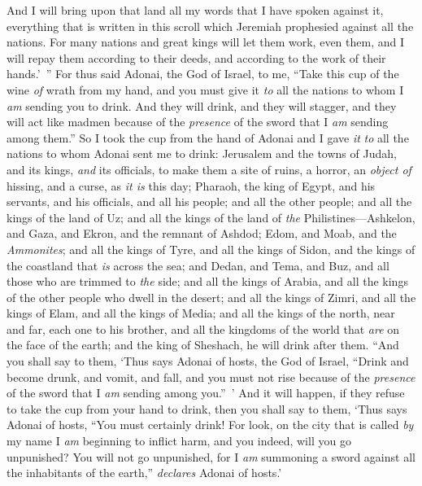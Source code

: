\begin{biblechapter}
\verse And I will bring upon that land all my words that I have spoken against it, everything that is written in this scroll which Jeremiah prophesied against all the nations.
\verse For many nations and great kings will let them work, even them, and I will repay them according to their deeds, and according to the work of their hands.’ ”
\verse For thus said Adonai, the God of Israel, to me, “Take this cup of the wine \textit{of} wrath from my hand, and you must give it \textit{to} all the nations to whom I \textit{am} sending you to drink.
\verse And they will drink, and they will stagger, and they will act like madmen because of the \textit{presence} of the sword that I \textit{am} sending among them.”
\verse So I took the cup from the hand of Adonai and I gave \textit{it} \textit{to} all the nations to whom Adonai sent me to drink:
\verse Jerusalem and the towns of Judah, and its kings, \textit{and} its officials, to make them a site of ruins, a horror, an \textit{object of} hissing, and a curse, as \textit{it is} this day;
\verse Pharaoh, the king of Egypt, and his servants, and his officials, and all his people;
\verse and all the other people; and all the kings of the land of Uz; and all the kings of the land of \textit{the} Philistines—Ashkelon, and Gaza, and Ekron, and the remnant of Ashdod;
\verse Edom, and Moab, and the \textit{Ammonites};
\verse and all the kings of Tyre, and all the kings of Sidon, and the kings of the coastland that \textit{is} across the sea;
\verse and Dedan, and Tema, and Buz, and all those who are trimmed to \textit{the} side;
\verse and all the kings of Arabia, and all the kings of the other people who dwell in the desert;
\verse and all the kings of Zimri, and all the kings of Elam, and all the kings of Media;
\verse and all the kings of the north, near and far, each one to his brother, and all the kingdoms of the world that \textit{are} on the face of the earth; and the king of Sheshach, he will drink after them.
\verse “And you shall say to them, ‘Thus says Adonai of hosts, the God of Israel, “Drink and become drunk, and vomit, and fall, and you must not rise because of the \textit{presence} of the sword that I \textit{am} sending among you.” ’
\verse And it will happen, if they refuse to take the cup from your hand to drink, then you shall say to them, ‘Thus says Adonai of hosts, “You must certainly drink!
\verse For look, on the city that is called \textit{by} my name I \textit{am} beginning to inflict harm, and you indeed, will you go unpunished? You will not go unpunished, for I \textit{am} summoning a sword against all the inhabitants of the earth,” \textit{declares} Adonai of hosts.’

\end{biblechapter}
